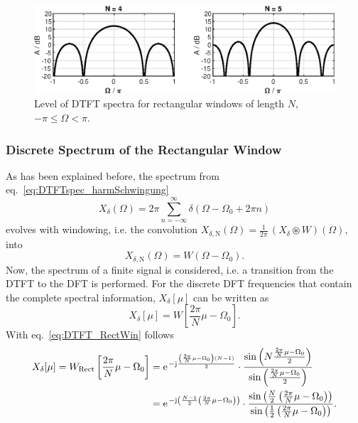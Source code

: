 \documentclass[11pt,a4paper,DIV=12]{scrartcl}
\begin{document}
\begin{figure}
		\centering
		\includegraphics[]{graphics/RectWindow_DTFT_log_sym}
		\caption{Level of DTFT spectra for rectangular windows of length $N$,
		$-\pi\leq\Omega<\pi$.}
		\label{RectWindow_DTFT_log_sym}
\end{figure}

\subsubsection{Discrete Spectrum of the Rectangular Window}
As has been explained before, the spectrum from eq.~\eqref{eq:DTFTspec_harmSchwingung}
%
\begin{equation}
X_\delta(\Omega)=2\pi\sum\limits_{n=-\infty}^\infty\delta(\Omega-\Omega_0+2\pi n)
\end{equation}
%
evolves with windowing, i.e. the convolution
$X_{\delta,\text{N}}(\Omega)=\frac{1}{2\pi}\,(X_\delta\circledast W)(\Omega)$,
into
%
\begin{equation}
X_{\delta,\text{N}}(\Omega)=W(\Omega-\Omega_0).
\end{equation}
%
Now, the spectrum of a finite signal is considered, i.e. a transition from the
DTFT to the DFT is performed.
%
For the discrete DFT frequencies that contain the complete spectral information,
$X_\delta[\mu]$ can be written as
%
\begin{equation}
X_\delta[\mu]=W\left[\frac{2\pi}{N}\mu-\Omega_0\right].
\end{equation}
%
With eq.~\eqref{eq:DTFT_RectWin} follows
%
\begin{align}
X_\delta[\mu]=W_\text{Rect}\left[\frac{2\pi}{N}\mu-\Omega_0\right]&=\e^{-\im\frac{\left(\frac{2\pi}{N}\mu-\Omega_0\right)(N-1)}{2}}\cdot\frac{\sin\left(N\frac{\frac{2\pi}{N}\mu-\Omega_0}{2}\right)}{\sin\left(\frac{\frac{2\pi}{N}\mu-\Omega_0}{2}\right)}\\
&=\e^{-\im\left(\frac{N-1}{2}\left(\frac{2\pi}{N}\mu-\Omega_0\right)\right)}\cdot\frac{\sin\left(\frac{N}{2}\left(\frac{2\pi}{N}\mu-\Omega_0\right)\right)}{\sin\left(\frac{1}{2}\left(\frac{2\pi}{N}\mu-\Omega_0\right)\right)}.
\label{eq:DFTspec_RectWin}
\end{align}
\end{document}
